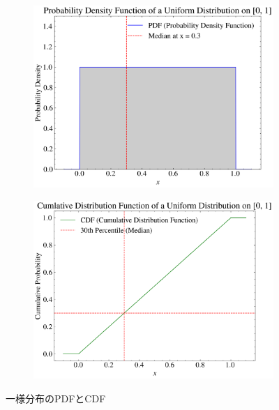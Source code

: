 \begin{figure}
	\centering
	\begin{subfigure}{0.48\columnwidth}
		\centering
		\includegraphics[width=0.8\linewidth]{src/figures/uniform-distribution-pdf-cdf-quantile/uniform_pdf.png}
	\end{subfigure}
	\begin{subfigure}{0.48\columnwidth}
		\centering
		\includegraphics[width=0.8\linewidth]{src/figures/uniform-distribution-pdf-cdf-quantile/uniform_cdf.png}
	\end{subfigure}
	\caption{一様分布のPDFとCDF}\label{fig:uniform-pdf-cdf}
\end{figure}
